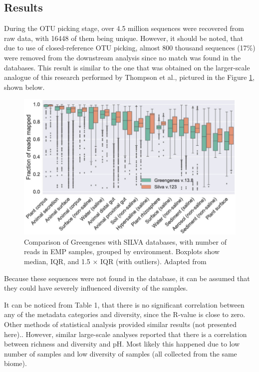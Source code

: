 \documentclass{article}
\begin{document}
\begin{multicols}{2}
\section{Results}
During the OTU picking stage, over 4.5 million sequences were recovered from raw data, with 16448 of them being unique. However, it should be noted, that due to use of closed-reference OTU picking, almost 800 thousand sequences (17\%) were removed from the downstream analysis since no match was found in the databases. This result is similar to the one that was obtained on the larger-scale analogue of this research performed by Thompson et al.\cite{Thompson2017}, pictured in the Figure \ref{fig:EMP_Silva}, shown below.
\begin{figure}[H]
	\includegraphics[width=1\linewidth]{./figs/EMP_SILVA.jpg}
	\caption{Comparison of Greengenes with SILVA databases, with number of reads in EMP samples, grouped by environment. Boxplots show median, IQR, and 1.5 × IQR (with outliers). Adapted from \cite{Thompson2017}}
	\label{fig:EMP_Silva}
\end{figure}
Because these sequences were not found in the database, it can be assumed that they could have severely influenced diversity of the samples.
\par
It can be noticed from Table 1, that there is no significant correlation between any of the metadata categories and diversity, since the R-value is close to zero. Other methods of statistical analysis provided similar results (not presented here).. However, similar large-scale analyses reported that there is a correlation between richness and diversity and pH\cite{Thompson2017,Fierer2006,Wu2016}.  Most likely this happened due to low number of samples and low diversity of samples (all collected from the same biome).


\end{multicols}
\end{document}
